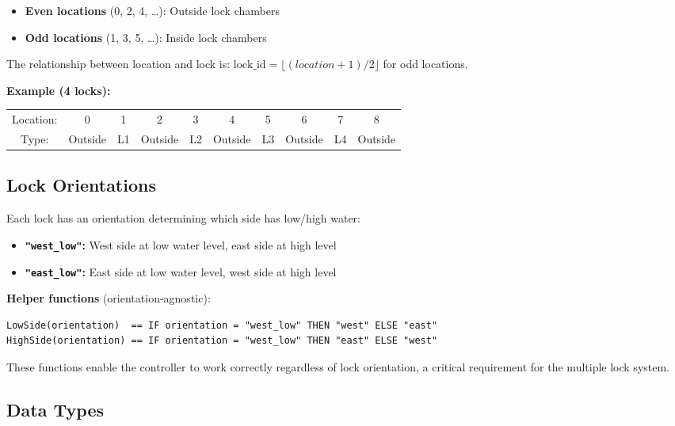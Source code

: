 \documentclass[12pt,a4paper]{article}
\begin{document}
\begin{itemize}
    \item \textbf{Even locations} (0, 2, 4, \ldots): Outside lock chambers
    \item \textbf{Odd locations} (1, 3, 5, \ldots): Inside lock chambers
\end{itemize}

The relationship between location and lock is: $\text{lock\_id} = \lfloor(location + 1) / 2\rfloor$ for odd locations.

\textbf{Example (4 locks):}
\begin{center}
\begin{tabular}{cccccccccc}
\toprule
Location: & 0 & 1 & 2 & 3 & 4 & 5 & 6 & 7 & 8 \\
Type: & Outside & L1 & Outside & L2 & Outside & L3 & Outside & L4 & Outside \\
\bottomrule
\end{tabular}
\end{center}

\subsection{Lock Orientations}

Each lock has an orientation determining which side has low/high water:

\begin{itemize}
    \item \textbf{\texttt{"west\_low"}:} West side at low water level, east side at high level
    \item \textbf{\texttt{"east\_low"}:} East side at low water level, west side at high level
\end{itemize}

\textbf{Helper functions} (orientation-agnostic):
\begin{lstlisting}[style=tlaplus]
LowSide(orientation)  == IF orientation = "west_low" THEN "west" ELSE "east"
HighSide(orientation) == IF orientation = "west_low" THEN "east" ELSE "west"
\end{lstlisting}

These functions enable the controller to work correctly regardless of lock orientation, a critical requirement for the multiple lock system.

\subsection{Data Types}
\end{document}

